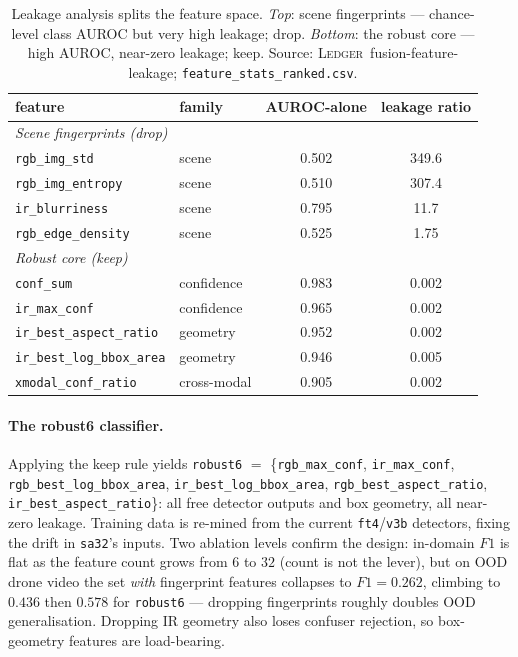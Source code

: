\begin{table}[htbp]
    \centering
    \caption{Leakage analysis splits the feature space. \emph{Top}: scene fingerprints --- chance-level class AUROC but very high leakage; drop. \emph{Bottom}: the robust core --- high AUROC, near-zero leakage; keep. Source: \textsc{Ledger}~fusion-feature-leakage; \texttt{feature\_stats\_ranked.csv}.}
    \label{tab:leakage}
    \begin{tabular}{llcc}
        \toprule
        feature & family & AUROC-alone & leakage ratio \\
        \midrule
        \multicolumn{4}{l}{\emph{Scene fingerprints (drop)}} \\
        \texttt{rgb\_img\_std}       & scene       & 0.502 & 349.6 \\
        \texttt{rgb\_img\_entropy}   & scene       & 0.510 & 307.4 \\
        \texttt{ir\_blurriness}      & scene       & 0.795 & 11.7 \\
        \texttt{rgb\_edge\_density}  & scene       & 0.525 & 1.75 \\
        \midrule
        \multicolumn{4}{l}{\emph{Robust core (keep)}} \\
        \texttt{conf\_sum}             & confidence  & 0.983 & 0.002 \\
        \texttt{ir\_max\_conf}         & confidence  & 0.965 & 0.002 \\
        \texttt{ir\_best\_aspect\_ratio} & geometry  & 0.952 & 0.002 \\
        \texttt{ir\_best\_log\_bbox\_area} & geometry & 0.946 & 0.005 \\
        \texttt{xmodal\_conf\_ratio}   & cross-modal & 0.905 & 0.002 \\
        \bottomrule
    \end{tabular}
\end{table}

\paragraph{The robust6 classifier.}
Applying the keep rule yields \texttt{robust6} $=$ \{\texttt{rgb\_max\_conf}, \texttt{ir\_max\_conf}, \texttt{rgb\_best\_log\_bbox\_area}, \texttt{ir\_best\_log\_bbox\_area}, \texttt{rgb\_best\_aspect\_ratio}, \texttt{ir\_best\_aspect\_ratio}\}: all free detector outputs and box geometry, all near-zero leakage. Training data is re-mined from the current \texttt{ft4}/\texttt{v3b} detectors, fixing the drift in \texttt{sa32}'s inputs. Two ablation levels confirm the design: in-domain $F1$ is flat as the feature count grows from $6$ to $32$ (count is not the lever), but on OOD drone video the set \emph{with} fingerprint features collapses to $F1=0.262$, climbing to $0.436$ then $0.578$ for \texttt{robust6} --- dropping fingerprints roughly doubles OOD generalisation. Dropping IR geometry also loses confuser rejection, so box-geometry features are load-bearing.

